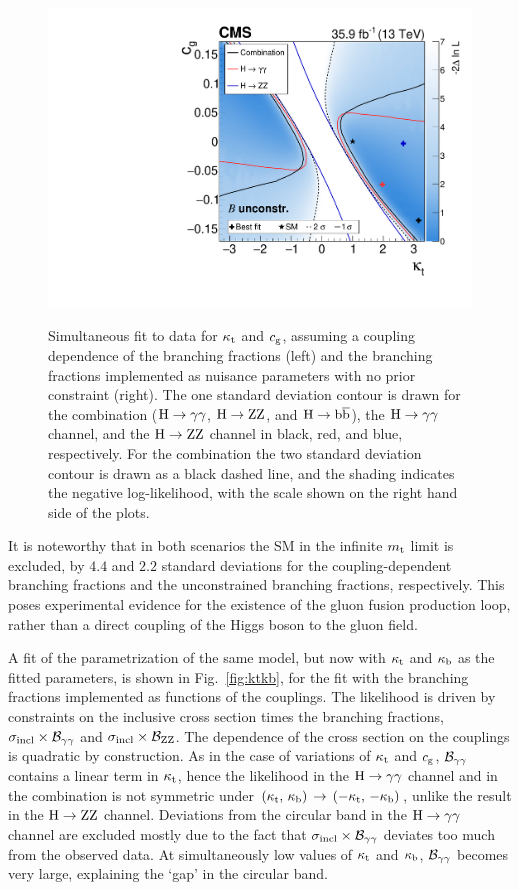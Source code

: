 \begin{figure}[hbtp]
\begin{center}
{        \includegraphics[width=0.49\linewidth]{img/interpretation/multicont_ktcg_floatingBRs.pdf}        
        }
    \caption{
        Simultaneous fit to data for $\kappa_{\mathrm{t}}$ and $c_\mathrm{g}$, assuming a coupling dependence of the branching fractions (left) and the branching fractions implemented as nuisance parameters with no prior constraint (right).
        The one standard deviation contour is drawn for the combination ($\mathrm{H}\to\mathrm{\gamma}\mathrm{\gamma}$, $\mathrm{H}\to\mathrm{Z}\mathrm{Z}$, and $\mathrm{H}\to\mathrm{b}\overline{\mathrm{b}}$), the $\mathrm{H}\to\mathrm{\gamma}\mathrm{\gamma}$ channel, and the $\mathrm{H}\to\mathrm{Z}\mathrm{Z}$ channel in black, red, and blue, respectively.
        For the combination the two standard deviation contour is drawn as a black dashed line, and the shading indicates the negative log-likelihood, with the scale shown on the right hand side of the plots.
        }
    \label{fig:ktcg}
  \end{center}
\end{figure}


It is noteworthy that in both scenarios the SM in the infinite $m_{\mathrm{t}}$ limit is excluded, by $4.4$ and $2.2$ standard deviations for the coupling-dependent branching fractions and the unconstrained branching fractions, respectively.
% 
This poses experimental evidence for the existence of the gluon fusion production loop, rather than a direct coupling of the Higgs boson to the gluon field.




A fit of the parametrization of the same model, but now with $\kappa_{\mathrm{t}}$ and $\kappa_{\mathrm{b}}$ as the fitted parameters, is shown in Fig.~\ref{fig:ktkb}, for the fit with the branching fractions implemented as functions of the couplings.
% 
The likelihood is driven by constraints on the inclusive cross section times the branching fractions, $\sigma_\text{incl} \times \mathcal{B}_{\mathrm{\gamma}\mathrm{\gamma}}$ and $\sigma_\text{incl} \times \mathcal{B}_{\mathrm{Z}\mathrm{Z}}$.
% 
The dependence of the cross section on the couplings is quadratic by construction.
% 
As in the case of variations of $\kappa_{\mathrm{t}}$ and $c_\mathrm{g}$, $\mathcal{B}_{\mathrm{\gamma}\mathrm{\gamma}}$ contains a linear term in $\kappa_{\mathrm{t}}$, hence the likelihood in the $\mathrm{H}\to\mathrm{\gamma}\mathrm{\gamma}$ channel and in the combination is not symmetric under $(\kappa_{\mathrm{t}},\,\kappa_{\mathrm{b}}) \, \to \, (-\kappa_{\mathrm{t}},\,-\kappa_{\mathrm{b}})$, unlike the result in the $\mathrm{H}\to\mathrm{Z}\mathrm{Z}$ channel.
% 
Deviations from the circular band in the $\mathrm{H}\to\mathrm{\gamma}\mathrm{\gamma}$ channel are excluded mostly due to the fact that $\sigma_\text{incl} \times \mathcal{B}_{\mathrm{\gamma}\mathrm{\gamma}}$ deviates too much from the observed data.
% 
At simultaneously low values of $\kappa_{\mathrm{t}}$ and $\kappa_{\mathrm{b}}$, $\mathcal{B}_{\mathrm{\gamma}\mathrm{\gamma}}$ becomes very large, explaining the `gap' in the circular band.


